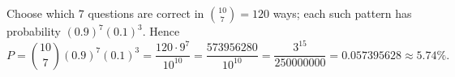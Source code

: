 Choose which $7$ questions are correct in $\binom{10}{7}=120$ ways; each such pattern has probability $(0.9)^7(0.1)^3$. Hence
\[
P=\binom{10}{7}(0.9)^7(0.1)^3=\dfrac{120\cdot9^7}{10^{10}}=\dfrac{573956280}{10^{10}}=\dfrac{3^{15}}{250000000}=\boxed{0.057395628}\approx5.74\%.
\]

